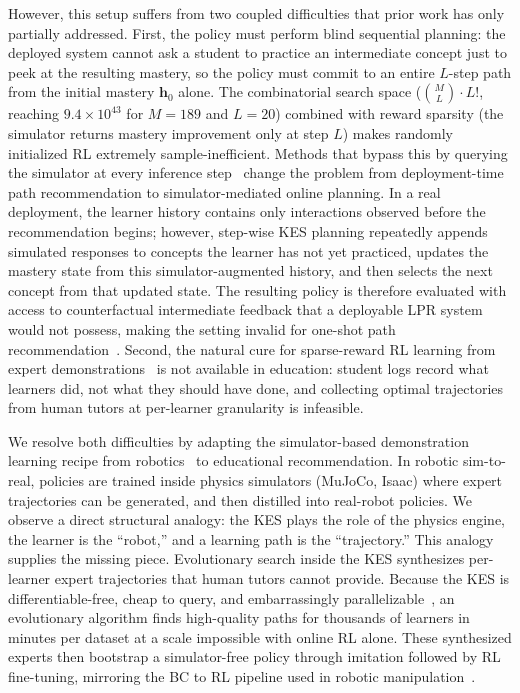\documentclass[sigconf,anonymous]{acmart}
\begin{document}
However, this setup suffers from two coupled difficulties that prior work has only partially addressed.
First, the policy must perform blind sequential planning: the deployed system cannot ask a student to practice an intermediate concept just to peek at the resulting mastery, so the policy must commit to an entire $L$-step path from the initial mastery $\mathbf{h}_0$ alone. The combinatorial search space ($\binom{M}{L}\cdot L!$, reaching $9.4\!\times\!10^{43}$ for $M=189$ and $L=20$) combined with reward sparsity (the simulator returns mastery improvement only at step $L$) makes randomly initialized RL extremely sample-inefficient. Methods that bypass this by querying the simulator at every inference step~\cite{liu2019cseal,li2023gehrl,cheng2025knowlp} change the problem from deployment-time path recommendation to simulator-mediated online planning. In a real deployment, the learner history contains only interactions observed before the recommendation begins; however, step-wise KES planning repeatedly appends simulated responses to concepts the learner has not yet practiced, updates the mastery state from this simulator-augmented history, and then selects the next concept from that updated state. The resulting policy is therefore evaluated with access to counterfactual intermediate feedback that a deployable LPR system would not possess, making the setting invalid for one-shot path recommendation~\cite{li2024privileged}.
Second, the natural cure for sparse-reward RL learning from expert demonstrations~\cite{rajeswaran2018dexterous,nair2018demonstrations,peng2019awr} is not available in education: student logs record what learners did, not what they should have done, and collecting optimal trajectories from human tutors at per-learner granularity is infeasible.

We resolve both difficulties by adapting the simulator-based demonstration learning recipe from robotics~\cite{rajeswaran2018dexterous,nair2018demonstrations} to educational recommendation. In robotic sim-to-real, policies are trained inside physics simulators (MuJoCo, Isaac) where expert trajectories can be generated, and then distilled into real-robot policies. We observe a direct structural analogy: the KES plays the role of the physics engine, the learner is the ``robot,'' and a learning path is the ``trajectory.'' This analogy supplies the missing piece. Evolutionary search inside the KES synthesizes per-learner expert trajectories that human tutors cannot provide. Because the KES is differentiable-free, cheap to query, and embarrassingly parallelizable~\cite{lange2023evosax,salimans2017es}, an evolutionary algorithm finds high-quality paths for thousands of learners in minutes per dataset at a scale impossible with online RL alone. These synthesized experts then bootstrap a simulator-free policy through imitation followed by RL fine-tuning, mirroring the BC to RL pipeline used in robotic manipulation~\cite{rajeswaran2018dexterous}.
\end{document}
